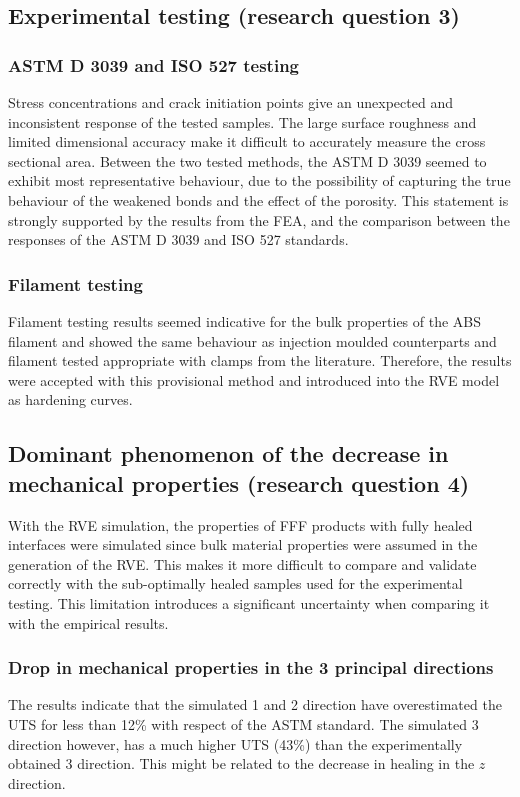 \subsection{Experimental testing (research question 3)}
\subsubsection{ASTM D 3039 and ISO 527 testing}
Stress concentrations and crack initiation points give an unexpected and inconsistent response of the tested samples. The large surface roughness and limited  dimensional accuracy make it difficult to accurately measure the cross sectional area. Between the two tested methods, the ASTM D 3039 seemed to exhibit most representative behaviour, due to the possibility of capturing the true behaviour of the weakened bonds and the effect of the porosity. This statement is strongly supported by the results from the FEA, and the comparison between the responses of the ASTM D 3039 and ISO 527 standards. 

\subsubsection{Filament testing}
Filament testing results seemed indicative for the bulk properties of the ABS filament and showed the same behaviour as injection moulded counterparts and filament tested appropriate with clamps from the literature. Therefore, the results were accepted with this provisional method and introduced into the RVE model as hardening curves.

\subsection{Dominant phenomenon of the decrease in mechanical properties (research question 4)}
With the RVE simulation, the properties of FFF products with fully healed interfaces were simulated since bulk material properties were assumed in the generation of the RVE. This makes it more difficult to compare and validate correctly with the sub-optimally healed samples used for the experimental testing. This limitation introduces a significant uncertainty when comparing it with the empirical results. 
\subsubsection{Drop in mechanical properties in the 3 principal directions}
The results indicate that the simulated 1 and 2 direction have overestimated the UTS for less than 12\% with respect of the ASTM standard. The simulated 3 direction however, has a much higher UTS (43\%) than the experimentally obtained 3 direction. This might be related to the decrease in healing in the $z$ direction. 

